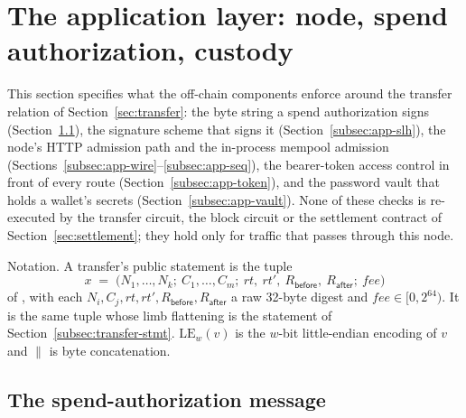 \section{The application layer: node, spend authorization, custody}
\label{sec:application}

This section specifies what the off-chain components enforce around the
transfer relation of Section~\ref{sec:transfer}: the byte string a spend
authorization signs (Section~\ref{subsec:app-msg}), the signature scheme that
signs it (Section~\ref{subsec:app-slh}), the node's HTTP admission path and the
in-process mempool admission (Sections~\ref{subsec:app-wire}--\ref{subsec:app-seq}),
the bearer-token access control in front of every route
(Section~\ref{subsec:app-token}), and the password vault that holds a wallet's
secrets (Section~\ref{subsec:app-vault}). None of these checks is re-executed by
the transfer circuit, the block circuit or the settlement contract of
Section~\ref{sec:settlement}; they hold only for traffic that passes through
this node.

Notation. A transfer's public statement is the tuple
\[
  x \;=\; \big(N_1,\dots,N_k;\ C_1,\dots,C_m;\ rt,\ rt',\ R_{\mathsf{before}},\ R_{\mathsf{after}};\ \mathit{fee}\big)
\]
of  , with
each $N_i, C_j, rt, rt', R_{\mathsf{before}}, R_{\mathsf{after}}$ a raw
32-byte digest and $\mathit{fee}\in[0,2^{64})$. It is the same tuple whose
limb flattening is the statement of Section~\ref{subsec:transfer-stmt}.
$\mathrm{LE}_{w}(v)$ is the $w$-bit little-endian encoding of $v$ and $\|$ is
byte concatenation.

\subsection{The spend-authorization message}
\label{subsec:app-msg}

